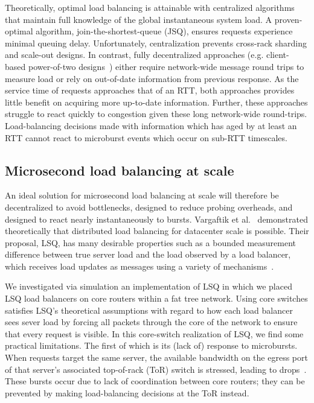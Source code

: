 Theoretically, optimal load balancing is attainable with centralized
algorithms~\cite{jsq_fcfs} that maintain full knowledge of the global
instantaneous system load.  
%
A proven-optimal algorithm, join-the-shortest-queue (JSQ), ensures requests experience minimal queuing delay.  
%
Unfortunately, centralization prevents cross-rack sharding and scale-out designs.  
%
In contrast, fully decentralized approaches (e.g. client-based power-of-two designs~\cite{power-of-two:tpds:2001}) either require network-wide message round trips to measure load or rely on out-of-date information from previous response.
%
As the service time of requests approaches that of an RTT, 
both approaches provides little benefit on acquiring more up-to-date information.
%
Further, these approaches struggle to react quickly to congestion given these long network-wide round-trips. 
%
Load-balancing decisions made with information which has aged by at least an RTT cannot react to microburst events which occur on sub-RTT timescales.

\subsection{Microsecond load balancing at scale}

An ideal solution for microsecond load balancing at scale will therefore be
decentralized to avoid bottlenecks, designed to reduce probing overheads, and
designed to react nearly instantaneously to bursts.
Vargaftik et al.~\cite{lsq} demonstrated theoretically that distributed
load balancing for datacenter scale is possible. Their proposal, LSQ, has many
desirable properties such as a bounded measurement difference between true
server load and the load observed by a load balancer, which receives load
updates as messages using a variety of mechanisms~\cite{lsq}. 

We investigated via simulation an implementation of LSQ in which we
placed LSQ load balancers on core routers within a fat tree
network. Using core switches satisfies LSQ's theoretical assumptions
with regard to how each load balancer sees sever load by forcing all
packets through the core of the network to ensure that every request
is visible.  In this core-switch realization of LSQ, we find some
practical limitations.  The first of which is its (lack of) response
to microbursts. When requests target the same server, the available
bandwidth on the egress port of that server's associated top-of-rack
(ToR) switch is stressed, leading to drops~\cite{facebook_microburst}. These bursts
occur due to lack of coordination between core routers; they can be
prevented by making load-balancing decisions at the ToR instead.

